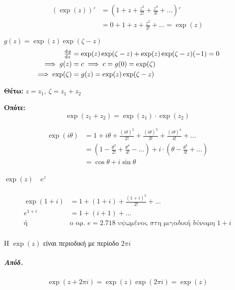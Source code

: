 \documentclass[12pt,a4paper,titlepage,fleqn]{article}
\begin{document}
    \begin{enumparen}{}
    	\item \begin{align*}
    	\left(\exp(z)\right)'
    	&= \left(1+z+\frac{z^2}{2!}+\frac{z^3}{3!}+\dots\right)'
    	\\ &= 0+1+z+\frac{z^2}{2!}+\dots = \exp(z)
    	\end{align*}
    	\item \( g(z)=\exp(z)\exp(\zeta-z) \)
    	\begin{align*}
    	\od{g}{z} &=
    	\exp(z)\exp(\zeta-z)+\exp(z)\exp(\zeta-z)(-1) = 0
    	\\ \implies g(z) &= c \implies c=g(0)=\exp(\zeta) \\
    	\implies \exp(\zeta)&=g(z)=\exp(z)\exp(\zeta-z)
    	\end{align*}

    	\textbf{Θέτω:} \( z=z_1,\ \zeta=z_1+z_2 \)

    	\textbf{Οπότε:}
    	\[
    	\exp(z_1+z_2) = \exp(z_1)\cdot\exp(z_2)
    	\]

    	\item \begin{align*}
    	\exp(i\theta) &= 1+i\theta + \frac{(i\theta)^2}{2!} + \frac{(i\theta)^3}{3!}
    	+\frac{(i\theta)^4}{4!} + \dots
    	\\ &= \left(1-\frac{\theta^2}{2!}+\frac{\theta^4}{4!}-\dots \right)
    	+ i\cdot\left(
    	\theta-\frac{\theta^3}{3!}+\dots
    	\right)
    	\\ &= \cos\theta+i\sin\theta
    	\end{align*}

    	\paragraph{\( \exp(z) \quad e^z \)}
    	\begin{align*}
    	\exp(1+i)&=1+(1+i)+\frac{(1+i)^2}{2!}+\dots\\[.4pt]
    	e^{1+i} &= 1+(i+1)+\dots\\
    	\text{ή}\quad &\text{ο αρ. $e=2.718$ υψωμένος στη μιγαδική δύναμη } 1+i
    	\end{align*}

    	\paragraph{}
    	\begin{theorem*}{}
    		Η \( \exp(z) \) είναι περιοδική με περίοδο \( 2\pi i \)
    	\end{theorem*}
    	\subparagraph{Απόδ.}
    	\[
    	\exp(z+2\pi i) = \exp(z)\exp(2\pi i) = \exp(z)
    	\]


\end{enumparen}
\end{document}
